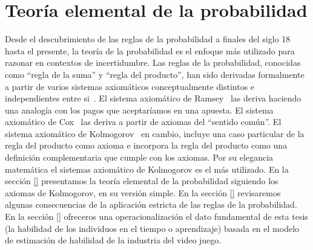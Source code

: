 \documentclass[a4paper,11pt]{book}
\theoremstyle{definition}
\begin{document}


\section{Teor\'ia elemental de la probabilidad} \label{sec:teoria_elemental_probabilidad}

Desde el descubrimiento de las reglas de la probabilidad a finales del siglo 18 hasta el presente, la teor\'ia de la probabilidad es el enfoque m\'as utilizado para razonar en contextos de incertidumbre.
%
Las reglas de la probabilidad, conocidas como ``regla de la suma'' y ``regla del producto'', han sido derivadas formalmente a partir de varios sistemas axiom\'aticos conceptualmente distintos e independientes entre si~\cite{halpern2017}.
%
El sistema axiom\'atico de Ramsey~\cite{Ramsey1926} las deriva haciendo una analog\'ia con los pagos que aceptar\'iamos en una apuesta.
%
El sistema axiom\'atico de Cox~\cite{Cox1946} las deriva a partir de axiomas del ``sentido com\'un''.
%
El sistema axiom\'atico de Kolmogorov~\cite{Kolmogorov1950} en cambio, incluye una caso particular de la regla del producto como axioma e incorpora la regla del producto como una definici\'on complementaria que cumple con los axiomas.
%
Por su elegancia matem\'atica el sistemas axiom\'atico de Kolmogorov es el m\'as utilizado.
%
En la secci\'on \ref{} presentamos la teor\'ia elemental de la probabilidad siguiendo los axiomas de Kolmogorov, en su versi\'on simple.
%
En la secci\'on \ref{} revisaremos algunas consecuencias de la aplicaci\'on estricta de las reglas de la probabilidad.
%
En la secci\'on \ref{} ofreceros una operacionalizaci\'on el dato fundamental de esta tesis (la habilidad de los individuos en el tiempo o aprendizaje) basada en el modelo de estimaci\'on de habilidad de la industria del video juego.
\end{document}
